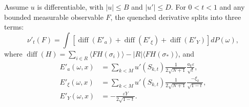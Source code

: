 \begin{theorem}\label{thm:sg-tal:perceptron-derivative-three-terms}
  \leanok
Assume $u$ is differentiable, with $|u|\le B$ and $|u'|\le D$. For $0<t<1$ and any bounded
measurable observable $F$, the quenched derivative splits into three terms:
\[
 \nu'_t(F) = \int \left[ \operatorname{diff}(E'_a) + \operatorname{diff}(E'_\xi) + \operatorname{diff}(E'_Y) \right] dP(\omega),
\]
where $\operatorname{diff}(H) = \sum_{i\in R} \langle F H(\sigma_i)\rangle - |R|\langle F H(\sigma_*)\rangle$, and
\begin{align*}
 E'_a(\omega, x) &= \sum_{k<M} u'(S_{k,t}) \frac{1}{2\sqrt{N+1}} \frac{a_k \varepsilon}{\sqrt{t}}, \\
 E'_\xi(\omega, x) &= \sum_{k<M} u'(S_{k,t}) \frac{1}{2\sqrt{N+1}} \frac{-\xi_k}{\sqrt{1-t}}, \\
 E'_Y(\omega, x) &= -\frac{\varepsilon Y}{2\sqrt{1-t}}.
\end{align*}
\end{theorem}
